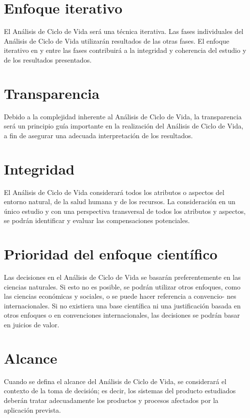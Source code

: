 \section{Enfoque iterativo}
El Análisis de Ciclo de Vida será una técnica iterativa. Las fases individuales del Análisis de Ciclo de Vida utilizarán resultados de las otras fases. El enfoque iterativo en y entre las fases contribuirá a la integridad y coherencia del estudio y de los resultados presentados.

\section{Transparencia}
Debido a la complejidad inherente al Análisis de Ciclo de Vida, la transparencia será un principio guía importante en la realización del Análisis de Ciclo de Vida, a fin de asegurar una adecuada interpretación de los resultados.

\section{Integridad}
El Análisis de Ciclo de Vida considerará todos los atributos o aspectos del entorno natural, de la salud humana y de los recursos. La consideración en un único estudio y con una perspectiva transversal de todos los atributos y aspectos, se podrán identificar y evaluar las compensaciones potenciales.

\section{Prioridad del enfoque científico}
Las decisiones en el Análisis de Ciclo de Vida se basarán preferentemente en las ciencias naturales. Si esto no es posible, se podrán utilizar otros enfoques, como las ciencias económicas y sociales, o se puede hacer referencia a convencio- nes internacionales. Si no existiera una base científica ni una justificación basada en otros enfoques o en convenciones internacionales, las decisiones se podrán basar en juicios de valor.

\section{Alcance}
Cuando se defina el alcance del Análisis de Ciclo de Vida, se considerará el contexto de la toma de decisión; es decir, los sistemas del producto estudiados deberán tratar adecuadamente los productos y procesos afectados por la aplicación prevista.


